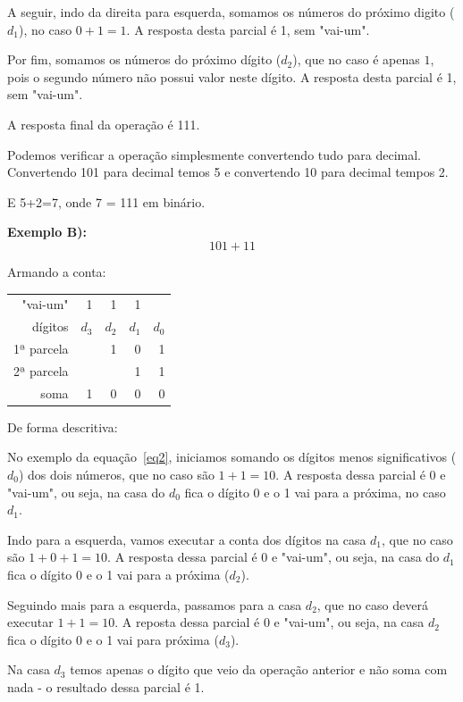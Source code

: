 A seguir, indo da direita para esquerda, somamos os números do próximo digito ($d_1$), no caso $ 0 + 1 = 1$. A resposta desta parcial é 1, sem "vai-um".

Por fim, somamos os números do próximo dígito ($d_2$), que no caso é apenas $1$, pois o segundo número não possui valor neste dígito. A resposta desta parcial é 1, sem "vai-um".

A resposta final da operação é 111.

Podemos verificar a operação simplesmente convertendo tudo para decimal. Convertendo 101 para decimal temos 5 e convertendo 10 para decimal tempos 2. 

E 5+2=7, onde 7 = 111 em binário.


\textbf{Exemplo B):}
\begin{equation}\label{eq2}
101 + 11
\end{equation}

Armando a conta:
\begin{table}[h]
	\centering
	\begin{tabular}{r|rrrr}
		"vai-um"	&  	1	&  	1	& 1		& 		\\
		dígitos		& $d_3$	& $d_2$ & $d_1$ & $d_0$ \\
		1ª parcela  &  		&   1 	& 0 	& 1 \\
		2ª parcela  &  		&   	& 1 	& 1 \\
		\hline
		soma	  	&  	1	&   0 	& 0 	& 0 \\
	\end{tabular}
\end{table}

De forma descritiva:

No exemplo da equação~\ref{eq2}, iniciamos somando os dígitos menos significativos ($d_0$) dos dois números, que no caso são $ 1 + 1 = 10$. A resposta dessa parcial é 0 e "vai-um", ou seja, na casa do $d_0$ fica o dígito 0 e o 1 vai para a próxima, no caso $d_1$. 

Indo para a esquerda, vamos executar a conta dos dígitos na casa $d_1$, que no caso são $1 + 0 + 1 = 10$. A resposta dessa parcial é 0 e "vai-um", ou seja, na casa do $d_1$ fica o dígito 0 e o 1 vai para a próxima ($d_2$).

Seguindo mais para a esquerda, passamos para a casa $d_2$, que no caso deverá executar $1 + 1 = 10$. A reposta dessa parcial é 0 e "vai-um", ou seja, na casa $d_2$ fica o dígito 0 e o 1 vai para próxima ($d_3$).

Na casa $d_3$ temos apenas o dígito que veio da operação anterior e não soma com nada - o resultado dessa parcial é 1.

